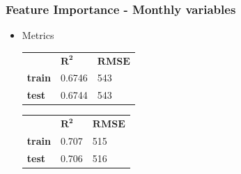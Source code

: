 \documentclass[serif, xcolor={dvipsnames}]{beamer} %
\begin{document}
\begin{frame}
\frametitle{Feature Importance - Monthly variables}
\begin{itemize}
\item Metrics
\begin{table}[!ht]
\hspace{-.5in}
\captionsetup{singlelinecheck=false, format=hang}
\label{tab:Metrics}
\begin{tabular}{lll}
\bottomrule
\cellcolor{palecornflowerblue}{\small f(T, P)} & \small{ $\mathbf{R^2}$}  & \small{ $\mathbf{RMSE}$} \\ 
\rowcolor{shadecolor} 
{\bf train} & 0.6746  &  543\\ 
{\bf test}  & 0.6744  & 543\\
\toprule
\end{tabular}\quad
\begin{tabular}{lll}
\bottomrule
\cellcolor{palecornflowerblue}{\small f(T, P, RH)} & $\mathbf{R^2}$  & \small{$\mathbf{RMSE}$} \\ 
\rowcolor{shadecolor} 
{\bf train} &  0.707  &  515\\ 
{\bf test}  & 0.706  & 516\\
\toprule
\end{tabular}
\end{table}


\end{itemize}
\end{frame}
\end{document}
